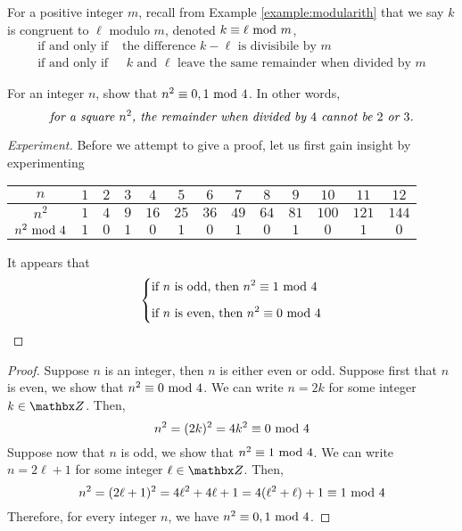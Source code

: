 \vspace*{1em}

\begin{remark}
For a positive integer $m$, recall from Example \ref{example:modularith} that we say $k$ is congruent to $\ell$ modulo $m$, denoted $k \equiv \ell \text{ mod }{m}$,
\begin{align*}
\text{if and only if} & \text{ the difference $k-\ell$ is divisibile by $m$}\\[0.5em]
\text{if and only if} & \text{ $k$ and $\ell$ leave the same remainder when divided by $m$}
\end{align*}
\end{remark}

\vspace*{1em}

\begin{example}\label{example:squareparity}
For an integer $n$, show that $n^2 \equiv 0,1\text{ mod }{4}$. In other words, \[\text{\emph{for a square $n^2$, the remainder when divided by $4$ cannot be $2$ or $3$.}}\]
\end{example}
\begin{proof}[Experiment]
\renewcommand{\qed}{}
Before we attempt to give a proof, let us first gain insight by experimenting
\begin{center}
{\renewcommand{\arraystretch}{1.5}%
\begin{tabular}{c|cccccccccccc}
$n$ & $1$ & $2$ & $3$ & $4$ & $5$ & $6$ & $7$ & $8$ & $9$ & $10$ & $11$ & $12$\\
\hline
$n^2$ & $1$ & $4$ & $9$ & $16$ & $25$ & $36$ & $49$ & $64$ & $81$ & $100$ & $121$ & $144$\\
\hline
$n^2\text{ mod }{4}$ & $1$ & $0$ & $1$ & $0$ & $1$ & $0$ & $1$ & $0$ & $1$ & $0$ & $1$ & $0$
\end{tabular}
}
\end{center}
It appears that
\begin{equation*}
\left\{\begin{aligned}
	&\text{if $n$ is odd, then $n^2 \equiv 1 \text{ mod }{4}$}\\[0.5em]
	&\text{if $n$ is even, then $n^2 \equiv 0 \text{ mod }{4}$}
\end{aligned}\right.
\end{equation*}
\end{proof}
\begin{proof}
Suppose $n$ is an integer, then $n$ is either even or odd. Suppose first that $n$ is even, we show that $n^2 \equiv 0 \text{ mod }{4}$. We can write $n = 2k$ for some integer $k \in \zz$. Then,
\[n^2 = (2k)^2 = 4k^2 \equiv 0 \text{ mod }{4}\]
Suppose now that $n$ is odd, we show that $n^2 \equiv 1 \text{ mod }{4}$. We can write $n = 2\ell + 1$ for some integer $\ell \in \zz$. Then,
\[n^2 = (2\ell + 1)^2 = 4\ell^2 + 4\ell + 1 = 4(\ell^2 + \ell) + 1 \equiv 1 \text{ mod }{4}\]
Therefore, for every integer $n$, we have $n^2 \equiv 0,1 \text{ mod }{4}$.
\end{proof}

